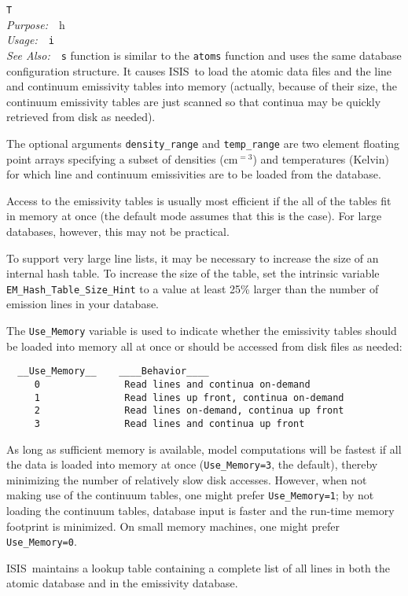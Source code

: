 \documentclass{book}
\makeatletter
\newif\ifpdf
\newcommand{\isisx}{{\sc ISIS~}}
\newenvironment{isisfunction}[4]%
{\index{{#1}@{\tt #1}}%
  \ifpdf
  \else
     \addcontentsline{toc}{subsection}{{#1} -- {#2}}
  \fi
  \vbox{
          \vspace*{\baselineskip}
          {\LARGE\tt #1}\vspace*{\baselineskip}\\
          {{\it Purpose:}~~{#2}}\\
          {{\it Usage:}~~{\tt #3}}\\
          {{\it See Also:}~~{\tt #4}}
       }
}%
{ }
\makeatother
\begin{document}
{\begin{isisfunction}
This function is similar to the {\tt atoms} function and uses the same
database configuration structure.  It causes \isisx to load the atomic
data files and the line and continuum emissivity tables into memory
(actually, because of their size, the continuum emissivity tables are
just scanned so that continua may be quickly retrieved from disk as
needed).

The optional arguments {\tt density\_range} and {\tt temp\_range} are
two element floating point arrays specifying a subset of densities
(cm${}^{=3}$) and temperatures (Kelvin) for which line and continuum
emissivities are to be loaded from the database.

Access to the emissivity tables is usually most efficient if the all
of the tables fit in memory at once (the default mode assumes that
this is the case).  For large databases, however, this may not be
practical.

To support very large line lists, it may be necessary to
increase the size of an internal hash table.  To increase the
size of the table, set the intrinsic variable
\verb|EM_Hash_Table_Size_Hint| to a value at least 25\% larger
than the number of emission lines in your database.

The {\tt Use\_Memory} variable is used to indicate whether
the emissivity tables should be loaded into memory all at once
or should be accessed from disk files as needed:

\begin{verbatim}
  __Use_Memory__    ____Behavior____
     0               Read lines and continua on-demand
     1               Read lines up front, continua on-demand
     2               Read lines on-demand, continua up front
     3               Read lines and continua up front
\end{verbatim}

As long as sufficient memory is available, model computations will
be fastest if all the data is loaded into memory at once
(\verb|Use_Memory=3|, the default), thereby minimizing the number
of relatively slow disk accesses. However, when not making use of
the continuum tables, one might prefer \verb|Use_Memory=1|; by not
loading the continuum tables, database input is faster and the
run-time memory footprint is minimized. On small memory machines,
one might prefer \verb|Use_Memory=0|.

\isisx maintains a lookup table containing a complete list of
all lines in both the atomic database and in the emissivity database.


\end{isisfunction}}
\end{document}
